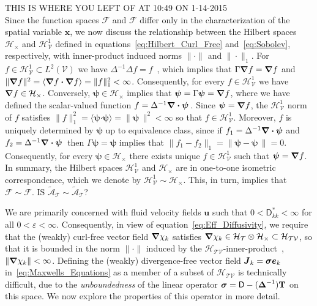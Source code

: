 \documentclass[leqno,onefignum,onetabnum]{siamltex1213}
\newcommand{\Tb}{\mathbf{T}}
\newcommand{\Tc}{\mathcal{T}}
\newcommand{\Vc}{\mathcal{V}}
\newcommand{\Hc}{\mathcal{H}}
\newcommand{\Fc}{\mathcal{F}}
\newcommand{\Ac}{\mathcal{A}}
\newcommand{\Dm}{\mathsf{D}}
\newcommand{\Hs}{\mathscr{H}}
\newcommand{\As}{\mathscr{A}}
\newcommand{\Fs}{\mathscr{F}}
\newcommand\bsig{\mbox{\boldmath${\sigma}$}}
\newcommand\bDelta{\mbox{\boldmath${\Delta}$}}
\newcommand\bnabla{\mbox{\boldmath${\nabla}$}}
\providecommand\bcdot{\boldsymbol{\cdot}}
\newcommand{\vecJ}{\boldsymbol{J}}
\newcommand{\vecx}{\boldsymbol{x}}
\newcommand{\vecu}{\boldsymbol{u}}
\newcommand{\vece}{\boldsymbol{e}}
\newcommand{\vecpsi}{\boldsymbol{\psi}}
\begin{document}
THIS IS WHERE YOU LEFT OF AT 10:49 ON 1-14-2015\\
Since the function spaces $\Fs$ and $\Fc$ differ
only in the characterization of the spatial variable $\vecx$, we now
discuss the relationship between the Hilbert spaces $\Hc_\times$ and
$\Hs^1_{\Vc}$ defined in equations~\eqref{eq:Hilbert_Curl_Free}
and~\eqref{eq:Sobolev}, respectively, with inner-product induced norms 
$\|\cdot\|$ and $\|\cdot\|_1$. For $f\in\Hs^1_{\Vc}\subset L^2(\Vc)$ we have 
$\Delta^{-1}\Delta f=f$~\cite{Stakgold:BVP:2000}, which implies that
$\Gamma\bnabla f=\bnabla f$ and
$\|\bnabla f\|^2=\langle\bnabla f\bcdot\bnabla f\rangle=\|f\|_1^2<\infty$. Consequently, for every  
$f\in\Hs^1_{\Vc}$ we have $\bnabla f\in\Hc_\times$. Conversely,
$\vecpsi\in\Hc_\times$ implies that $\vecpsi=\Gamma\vecpsi=\bnabla f$, where
we have defined the scalar-valued function
$f=\Delta^{-1}\bnabla \bcdot\vecpsi\,$. Since $\vecpsi=\bnabla f$, the
$\Hs^1_{\Vc}$ norm of $f$ satisfies
$\|f\|_1^2=\langle\vecpsi\bcdot\vecpsi\rangle=\|\vecpsi\,\|^2<\infty$ so that
$f\in\Hs^1_{\Vc}$. Moreover, $f$ is uniquely determined by $\vecpsi$ up
to equivalence class, since if $f_1=\Delta^{-1}\bnabla \bcdot\vecpsi$ and
$f_2=\Delta^{-1}\bnabla \bcdot\vecpsi\,$ then $\Gamma\vecpsi=\vecpsi$ implies
that $\|f_1-f_2\|_1=\|\vecpsi-\vecpsi\,\|=0$. Consequently, for every  
$\vecpsi\in\Hc_\times$ there exists unique $f\in\Hs^1_{\Vc}$ such that
$\vecpsi=\bnabla f$.  In summary, the Hilbert spaces $\Hs^1_{\Vc}$ and
$\Hc_\times$ are in one-to-one isometric correspondence, which we denote by
$\Hs^1_{\Vc}\sim\Hc_\times$. This, in turn, implies that $\Fs\sim\Fc$.  IS
$\tilde{\As}_{\Tc}\sim\tilde{\Ac}_{\Tc}$? 




\newpage
We are primarily concerned with fluid velocity fields $\vecu $ such
that $0<\Dm^*_{kk}<\infty$ for all $0<\varepsilon<\infty$. Consequently, in view of
equation~\eqref{eq:Eff_Diffusivity}, we require that the (weakly)
curl-free vector field $\bnabla \chi_k$ satisfies
$\bnabla \chi_k\in\Hc_{\Tc}\otimes\Hc_\times\subset\Hc_{\Tc\Vc}$, so that it is
bounded in the norm $\|\cdot\|$ induced by the
$\Hc_{\Tc\Vc}$-inner-product~\cite{Folland:99}, $\|\bnabla
\chi_k\|<\infty$. Defining the (weakly) 
divergence-free vector field $\vecJ_k=\bsig\vece _k$
in~\eqref{eq:Maxwells_Equations} as a member of a subset of 
$\Hc_{\Tc\Vc}$ is technically difficult, due to the
\emph{unboundedness} of the linear operator
$\bsig=\Dm-(\bDelta^{-1})\Tb$ on this space. We now explore the
properties of this operator in more detail.  
\end{document}
